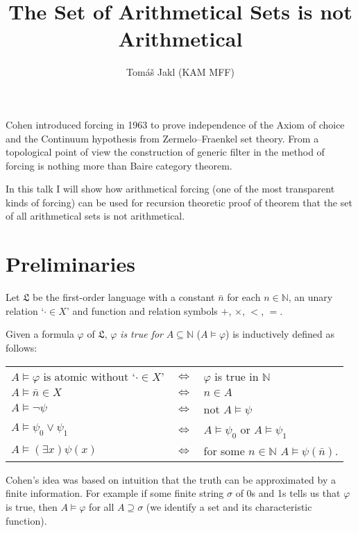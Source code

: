 \documentclass{js}
\newcommand\m[1]{\mathbb { #1 }}
\newcommand\N{\ensuremath{\m N}}
\begin{document}
\title{The Set of Arithmetical Sets is not Arithmetical}
\author{Tom\'a\v s Jakl (KAM MFF)}
\maketitle

Cohen introduced forcing in 1963 to prove independence of the Axiom of choice
and the Continuum hypothesis from Zermelo--Fraenkel set theory. From a
topological point of view the construction of generic filter in the method of
forcing is nothing more than Baire category theorem.

In this talk I will show how arithmetical forcing (one of the most transparent
kinds of forcing) can be used for recursion theoretic proof of theorem that the
set of all arithmetical sets is not arithmetical.

\section{Preliminaries}

\begin{definition}
    Let $\mathfrak L$ be the first-order language with a constant $\bar n$ for each $n \in \N$, an unary relation `$\cdot \in X$' and function and relation  symbols $+$, $\times$,  $<$, $=$.

    \vspace{0.2em}
    Given a formula $\varphi$ of $\mathfrak L$, $\varphi$ \emph{is true for} $A \subseteq \N$ ($A \models \varphi$) is inductively defined as follows:

    \begin{tabular}{l c l}
        $A \models \varphi \text{ is atomic without `} \cdot \in X$' & $\iff$ & $\varphi$ is true in \N \\
        $A \models \bar n \in X$ & $\iff$ & $n \in A$ \\
        $A \models \neg \psi$ & $\iff$ & not $A \models \psi$ \\
        $A \models \psi_0 \lor \psi_1$ & $\iff$ &  $A \models \psi_0$ or $A \models \psi_1$ \\
        $A \models (\exists x)\psi(x)$ & $\iff$ &for some $n\in\N$ $A \models \psi(\bar{n})$. \\
    \end{tabular}
\end{definition}

Cohen's idea was based on intuition that the truth can be approximated by a
finite information. For example if some finite string $\sigma$ of 0s and 1s
tells us that $\varphi$ is true, then $A \models \varphi$ for all $A \supseteq
\sigma$ (we identify a set and its characteristic function).
\end{document}
